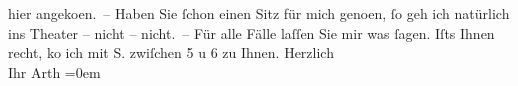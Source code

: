 \begin{ledgroupsized}[t]{13cm}
               hier angeko{\geminationm}en. – Haben Sie ſchon einen Sitz für mich
                  geno{\geminationm}en, ſo geh ich natürlich ins Theater – nicht –
               nicht. – Für alle Fälle laſſen Sie mir was ſagen. {\pb}Iſts Ihnen recht, ko{\geminationm} ich mit \textsc{S.} zwiſchen 5 u 6 zu Ihnen.\pend
           \pstart
           Herzlich{\\[\baselineskip]}Ihr \spacefill\mbox{Arth}\pend
           \leftskip=0em{}
         
         \endnumbering{}\end{ledgroupsized}  \newcommand{\dateiname}{L00469}\newcommand{\titel}{Arthur Schnitzler an Richard Beer-Hofmann, [5. 8. 1895?]}\newcommand{\editorInnen}{Martin Anton Müller und Gerd-Hermann Susen}
      